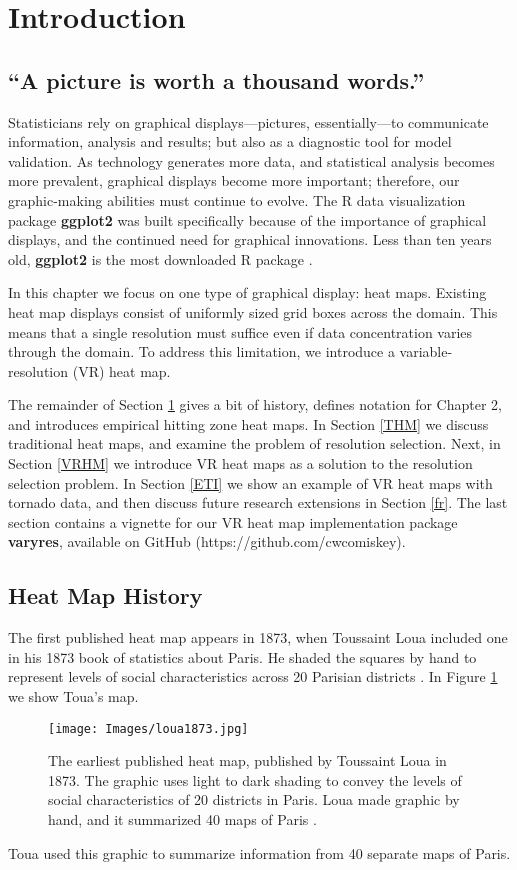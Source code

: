 \section{Introduction} \label{intro}

\subsection{``A picture is worth a thousand words.''} 

Statisticians rely on graphical displays---pictures, essentially---to communicate information, analysis and results; but also as a diagnostic tool for model validation. As technology generates more data, and statistical analysis becomes more prevalent, graphical displays become more important; therefore, our graphic-making abilities must continue to evolve. The R data visualization package {\bf ggplot2} \citep{Wickham2009} was built specifically because of the importance of graphical displays, and the continued need for graphical innovations. Less than ten years old, {\bf ggplot2} is the most downloaded R package \citep{rdoc}.

In this chapter we focus on one type of graphical display: heat maps. Existing heat map displays consist of uniformly sized grid boxes across the domain. This means that a single resolution must suffice even if data concentration varies through the domain. To address this limitation, we introduce a variable-resolution (VR) heat map.

The remainder of Section \ref{intro} gives a bit of history, defines notation for Chapter 2, and introduces empirical hitting zone heat maps. In Section \ref{THM} we discuss traditional heat maps, and examine the problem of resolution selection. Next, in Section \ref{VRHM} we introduce VR heat maps as a solution to the resolution selection problem. In Section \ref{ETI} we show an example of VR heat maps with tornado data, and then discuss future research extensions in Section \ref{fr}. The last section contains a vignette for our VR heat map implementation package {\bf varyres}, available on GitHub (https://github.com/cwcomiskey).

\subsection{Heat Map History} %

The first published heat map appears in 1873, when Toussaint Loua included one in his 1873 book of statistics about Paris. He shaded the squares by hand to represent levels of social characteristics across 20 Parisian districts \citep{Friendly2009}. In Figure \ref{fig:toua} we show Toua's map. 
  \begin{figure}[H]
	\centering
	\texttt{[image: Images/loua1873.jpg]} 
  \caption{The earliest published heat map, published by Toussaint Loua in 1873. The graphic uses light to dark shading to convey the levels of social characteristics of 20 districts in Paris. Loua made graphic by hand, and it summarized 40 maps of Paris \citep{Friendly2009}.}
  \label{fig:toua}
	\end{figure}
Toua used this graphic to summarize information from 40 separate maps of Paris. 

